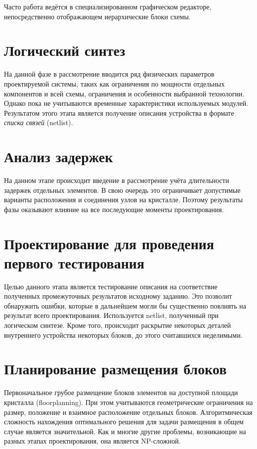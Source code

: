 Часто работа ведётся в специализированном графическом редакторе, непосредственно отображающем иерархические блоки схемы.

\section{Логический синтез}\label{logicsynthesis}

На данной фазе в рассмотрение вводится ряд физических параметров проектируемой системы, таких как ограничения по мощности отдельных компонентов и всей схемы, ограничения и особенности выбранной технологии. Однако пока не учитываются временн\textit{ы}е характеристики используемых модулей. Результатом этого этапа является получение описания устройства в формате \textit{списка связей} (\abbr netlist).

\section{Анализ задержек}

На данном этапе происходит введение в рассмотрение учёта длительности задержек отдельных элементов. В свою очередь это ограничивает допустимые варианты расположения и соединения узлов на кристалле. Поэтому результаты фазы оказывают влияние на все последующие моменты проектирования.

\section{Проектирование для проведения первого тестирования}

Целью данного этапа является тестирование описания на соответствие полученных промежуточных результатов исходному заданию. Это позволит обнаружить ошибки, которые в дальнейшем могли бы существенно повлиять на результат всего проектирования. Используется netlist, полученный при логическом синтезе. Кроме того, происходит раскрытие некоторых деталей внутреннего устройства некоторых блоков, до этого считавшихся неделимыми.

\section{Планирование размещения блоков}

Первоначальное грубое размещение блоков элементов на доступной площади кристалла (\abbr floorplanning). При этом учитываются геометрические ограничения на размер, положение и взаимное расположение отдельных блоков. Алгоритмическая сложность нахождения оптимального решения для задачи размещения в общем случае является значительной. Как и многие другие проблемы, возникающие на разных этапах проектирования, она является NP-сложной.

